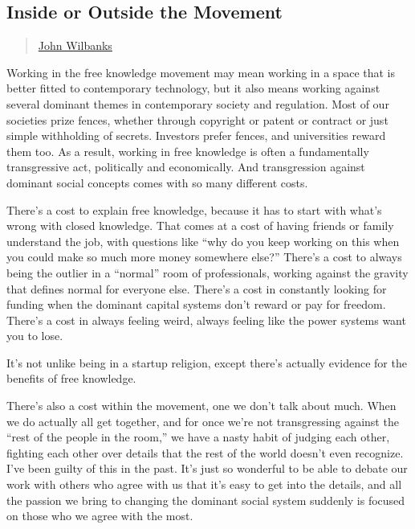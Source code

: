 \subsection{Inside or Outside the
Movement}\label{inside-or-outside-the-movement}

\begin{quote}
\href{../appendix/attributions.html\#john-wilbanks}{John Wilbanks}
\end{quote}

Working in the free knowledge movement may mean working in a space that
is better fitted to contemporary technology, but it also means working
against several dominant themes in contemporary society and regulation.
Most of our societies prize fences, whether through copyright or patent
or contract or just simple withholding of secrets. Investors prefer
fences, and universities reward them too. As a result, working in free
knowledge is often a fundamentally transgressive act, politically and
economically. And transgression against dominant social concepts comes
with so many different costs.

There's a cost to explain free knowledge, because it has to start with
what's wrong with closed knowledge. That comes at a cost of having
friends or family understand the job, with questions like ``why do you
keep working on this when you could make so much more money somewhere
else?'' There's a cost to always being the outlier in a ``normal'' room
of professionals, working against the gravity that defines normal for
everyone else. There's a cost in constantly looking for funding when the
dominant capital systems don't reward or pay for freedom. There's a cost
in always feeling weird, always feeling like the power systems want you
to lose.

It's not unlike being in a startup religion, except there's actually
evidence for the benefits of free knowledge.

There's also a cost within the movement, one we don't talk about much.
When we do actually all get together, and for once we're not
transgressing against the ``rest of the people in the room,'' we have a
nasty habit of judging each other, fighting each other over details that
the rest of the world doesn't even recognize. I've been guilty of this
in the past. It's just so wonderful to be able to debate our work with
others who agree with us that it's easy to get into the details, and all
the passion we bring to changing the dominant social system suddenly is
focused on those who we agree with the most.

